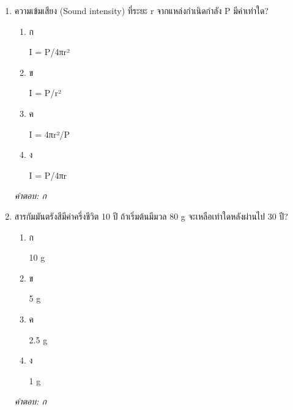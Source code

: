 \documentclass[12pt]{article}
\begin{document}
\begin{enumerate}[label=\arabic*., itemsep=0.5\baselineskip, topsep=0.5\baselineskip, leftmargin=*]
\item ความเข้มเสียง (Sound intensity) ที่ระยะ r จากแหล่งกำเนิดกำลัง P มีค่าเท่าใด?
\begin{enumerate}[label=\alph*)., itemsep=0.3\baselineskip, topsep=0.3\baselineskip]
\item ก\ 
\begin{minipage}[t]{0.9\linewidth}
\raggedright I = P/4πr²
\end{minipage}
\item ข\ 
\begin{minipage}[t]{0.9\linewidth}
\raggedright I = P/r²
\end{minipage}
\item ค\ 
\begin{minipage}[t]{0.9\linewidth}
\raggedright I = 4πr²/P
\end{minipage}
\item ง\ 
\begin{minipage}[t]{0.9\linewidth}
\raggedright I = P/4πr
\end{minipage}
\end{enumerate}
\vspace{-0.3\baselineskip}
\begin{small}
\textit{คำตอบ: ก}
\end{small}

\item สารกัมมันตรังสีมีค่าครึ่งชีวิต 10 ปี ถ้าเริ่มต้นมีมวล 80 g จะเหลือเท่าใดหลังผ่านไป 30 ปี?
\begin{enumerate}[label=\alph*)., itemsep=0.3\baselineskip, topsep=0.3\baselineskip]
\item ก\ 
\begin{minipage}[t]{0.9\linewidth}
\raggedright 10 g
\end{minipage}
\item ข\ 
\begin{minipage}[t]{0.9\linewidth}
\raggedright 5 g
\end{minipage}
\item ค\ 
\begin{minipage}[t]{0.9\linewidth}
\raggedright 2.5 g
\end{minipage}
\item ง\ 
\begin{minipage}[t]{0.9\linewidth}
\raggedright 1 g
\end{minipage}
\end{enumerate}
\vspace{-0.3\baselineskip}
\begin{small}
\textit{คำตอบ: ก}
\end{small}


\end{enumerate}
\end{document}
